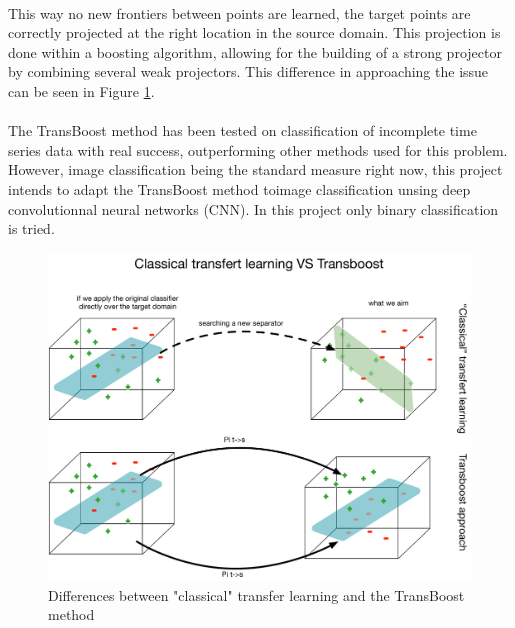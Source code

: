 \documentclass[11 pt]{article}
\begin{document}
\paragraph{} This way no new frontiers between points are learned, the target points are correctly projected at the right location in the source domain. This projection is done within a boosting algorithm, allowing for the building of a strong projector by combining several weak projectors. This difference in approaching the issue can be seen in Figure \ref{figDiff}. 


\paragraph{}The TransBoost method has been tested on classification of incomplete time series data with real success, outperforming other methods used for this problem. However, image classification being the standard measure right now, this project intends to adapt the TransBoost method toimage classification unsing deep convolutionnal neural networks (CNN). In this project only binary classification is tried.  

\begin{figure}[H]
  \includegraphics[width=\textwidth]{fig2.pdf}
  \caption{Differences between "classical" transfer learning and the TransBoost method}
  \label{figDiff}
\end{figure}
\end{document}
